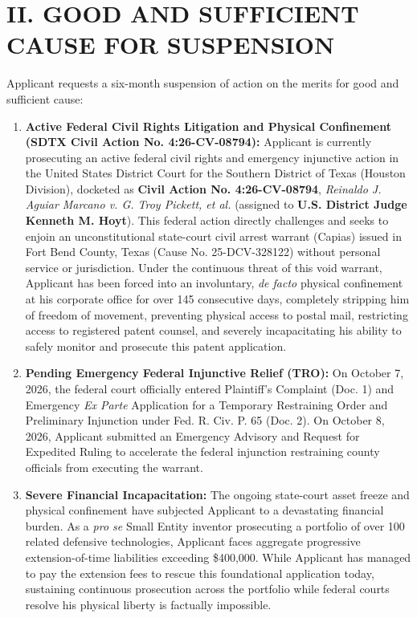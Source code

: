 \documentclass[11pt,letterpaper]{article}
\begin{document}
\section*{II. GOOD AND SUFFICIENT CAUSE FOR SUSPENSION}

Applicant requests a six-month suspension of action on the merits for good and sufficient cause:

\begin{enumerate}[leftmargin=2em, itemsep=3pt, parsep=0pt]
    \item \textbf{Active Federal Civil Rights Litigation and Physical Confinement (SDTX Civil Action No. 4:26-CV-08794):} Applicant is currently prosecuting an active federal civil rights and emergency injunctive action in the United States District Court for the Southern District of Texas (Houston Division), docketed as \textbf{Civil Action No. 4:26-CV-08794}, \textit{Reinaldo J. Aguiar Marcano v. G. Troy Pickett, et al.} (assigned to \textbf{U.S. District Judge Kenneth M. Hoyt}). This federal action directly challenges and seeks to enjoin an unconstitutional state-court civil arrest warrant (Capias) issued in Fort Bend County, Texas (Cause No. 25-DCV-328122) without personal service or jurisdiction. Under the continuous threat of this void warrant, Applicant has been forced into an involuntary, \textit{de facto} physical confinement at his corporate office for over 145 consecutive days, completely stripping him of freedom of movement, preventing physical access to postal mail, restricting access to registered patent counsel, and severely incapacitating his ability to safely monitor and prosecute this patent application.
    \item \textbf{Pending Emergency Federal Injunctive Relief (TRO):} On October 7, 2026, the federal court officially entered Plaintiff's Complaint (Doc. 1) and Emergency \textit{Ex Parte} Application for a Temporary Restraining Order and Preliminary Injunction under Fed. R. Civ. P. 65 (Doc. 2). On October 8, 2026, Applicant submitted an Emergency Advisory and Request for Expedited Ruling to accelerate the federal injunction restraining county officials from executing the warrant.
    \item \textbf{Severe Financial Incapacitation:} The ongoing state-court asset freeze and physical confinement have subjected Applicant to a devastating financial burden. As a \textit{pro se} Small Entity inventor prosecuting a portfolio of over 100 related defensive technologies, Applicant faces aggregate progressive extension-of-time liabilities exceeding \$400,000. While Applicant has managed to pay the extension fees to rescue this foundational application today, sustaining continuous prosecution across the portfolio while federal courts resolve his physical liberty is factually impossible.
\end{enumerate}
\end{document}
